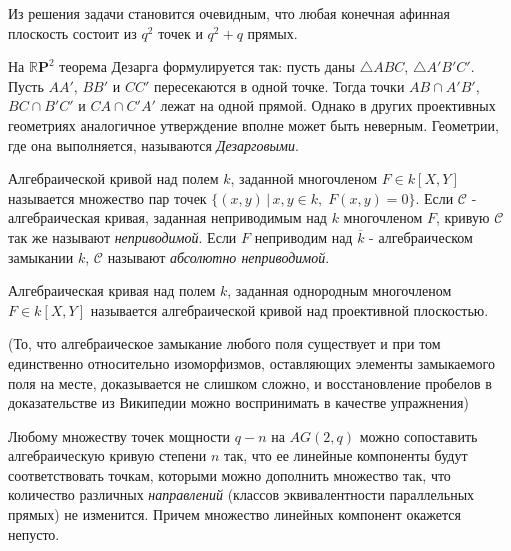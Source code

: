 \documentclass{article}
\newenvironment{theorem}[2][Теорема]{\begin{trivlist}
\item[\hskip \labelsep {\bfseries #1}\hskip \labelsep {\bfseries #2.}]}{\end{trivlist}}
\newenvironment{definition}[2][Определение]{\begin{trivlist}
\item[\hskip \labelsep {\bfseries #1}\hskip \labelsep {\bfseries #2.}]}{\end{trivlist}}
\newenvironment{exercise}[2][Упражнение]{\begin{trivlist}
\item[\hskip \labelsep {\bfseries #1}\hskip \labelsep {\bfseries #2.}]}{\end{trivlist}}
\newenvironment{hence}[2][Следствие]{\begin{trivlist}
\item[\hskip \labelsep {\bfseries #1}\hskip \labelsep {\bfseries #2}]}{\end{trivlist}}
\begin{document}
\begin{hence}{}
Из решения задачи становится очевидным, что любая конечная афинная плоскость состоит из $q^2$ точек и $q^2+q$ прямых.
\end{hence}

\begin{theorem}{Дезарга}
На $\mathbb{R}\mathbf{P}^2$ теорема Дезарга формулируется так: пусть даны $\triangle ABC$, $\triangle A'B'C'$. Пусть $AA'$, $BB'$ и $CC'$ пересекаются в одной точке. Тогда точки $AB\cap A'B'$, $BC\cap B'C'$ и $CA\cap C'A'$ лежат на одной прямой. Однако в других проективных геометриях аналогичное утверждение вполне может быть неверным. Геометрии, где она выполняется, называются \emph{Дезарговыми}.
\end{theorem}


\begin{definition}{(Алгебраическая кривая)}
Алгебраической кривой над полем $k$, заданной многочленом $F\in k[X,Y]$ называется множество пар точек $\{(x,y)\,|\,x,y\in k,\;F(x,y)=0\}$.
Если $\mathscr{C}$ - алгебраическая кривая, заданная неприводимым над $k$ многочленом $F$, кривую $\mathscr{C}$ так же называют \emph{неприводимой}. Если $F$ неприводим над $\overline{k}$ - алгебраическом замыкании $k$, $\mathscr{C}$ называют \emph{абсолютно неприводимой}.
\end{definition}

\begin{definition}{(Алгебраическая кривая на проективной плоскости)}
Алгебраическая кривая над полем $k$, заданная однородным многочленом $F\in k[X,Y]$ называется алгебраической кривой над проективной плоскостью. 
\end{definition}

\noindent(То, что алгебраическое замыкание любого поля существует и при том единственно относительно изоморфизмов, оставляющих элементы замыкаемого поля на месте, доказывается не слишком сложно, и восстановление пробелов в доказательстве из Википедии можно воспринимать в качестве упражнения)

\begin{theorem}{(Tamas Szonyi, 1994)}
Любому множеству точек мощности $q-n$ на $AG(2,q)$ можно сопоставить алгебраическую кривую степени $n$ так, что ее линейные компоненты будут соответствовать точкам, которыми можно дополнить множество так, что количество различных \emph{направлений} (классов эквивалентности параллельных прямых) не изменится. Причем множество линейных компонент окажется непусто.
\end{theorem}
\end{document}
